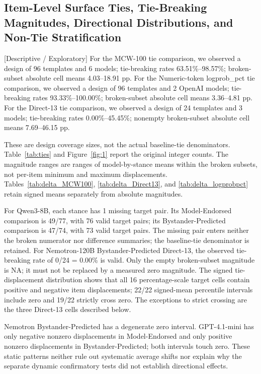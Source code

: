 \documentclass[11pt]{article}
\begin{document}
\subsection{Item-Level Surface Ties, Tie-Breaking Magnitudes, Directional Distributions, and Non-Tie Stratification}
[Descriptive / Exploratory] For the MCW-100 tie comparison, we observed a design of 96 templates and 6 models; tie-breaking rates 63.51\%--98.57\%; broken-subset absolute cell means 4.03--18.91 pp.
For the Numeric-token logprob\_pct tie comparison, we observed a design of 96 templates and 2 OpenAI models; tie-breaking rates 93.33\%--100.00\%; broken-subset absolute cell means 3.36--4.81 pp.
For the Direct-13 tie comparison, we observed a design of 24 templates and 3 models; tie-breaking rates 0.00\%--45.45\%; nonempty broken-subset absolute cell means 7.69--46.15 pp.

These are design coverage sizes, not the actual baseline-tie denominators. Table~\ref{tab:ties} and Figure~\ref{fig:1} report the original integer counts. The magnitude ranges are ranges of model-by-stance means within the broken subsets, not per-item minimum and maximum displacements. Tables~\ref{tab:delta_MCW100}, \ref{tab:delta_Direct13}, and \ref{tab:delta_logprobpct} retain signed means separately from absolute magnitudes.

For Qwen3-8B, each stance has 1 missing target pair. Its Model-Endorsed comparison is 49/77, with 76 valid target pairs; its Bystander-Predicted comparison is 47/74, with 73 valid target pairs. The missing pair enters neither the broken numerator nor difference summaries; the baseline-tie denominator is retained.
For Nemotron-120B Bystander-Predicted Direct-13, the observed tie-breaking rate of 0/24 = 0.00\% is valid. Only the empty broken-subset magnitude is NA; it must not be replaced by a measured zero magnitude.
The signed tie-displacement distribution shows that all 16 percentage-scale target cells contain positive and negative item displacements; 22/22 signed-mean percentile intervals include zero and 19/22 strictly cross zero. The exceptions to strict crossing are the three Direct-13 cells described below.

Nemotron Bystander-Predicted has a degenerate zero interval. GPT-4.1-mini has only negative nonzero displacements in Model-Endorsed and only positive nonzero displacements in Bystander-Predicted; both intervals touch zero. These static patterns neither rule out systematic average shifts nor explain why the separate dynamic confirmatory tests did not establish directional effects.
\end{document}
